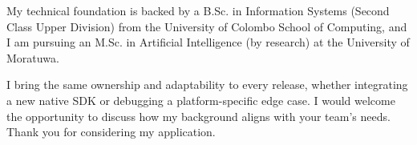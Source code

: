 \documentclass[11pt]{article}
\begin{document}
My technical foundation is backed by a B.Sc. in Information Systems (Second Class Upper Division) from the University of Colombo School of Computing, and I am pursuing an M.Sc. in Artificial Intelligence (by research) at the University of Moratuwa.

I bring the same ownership and adaptability to every release, whether integrating a new native SDK or debugging a platform-specific edge case. I would welcome the opportunity to discuss how my background aligns with your team's needs. Thank you for considering my application.

\end{document}
